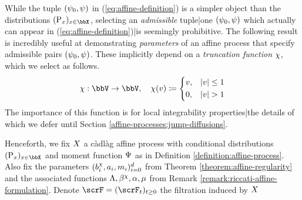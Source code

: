 While the tuple $(\psi_0, \psi)$ in (\ref{eq:affine-definition}) is a simpler object than the distributions $(\Prb_\stateVar)_{\stateVar\in\stateSpace}$, selecting an \emph{admissible} tuple|one $(\psi_0, \psi)$ which actually can appear in (\ref{eq:affine-definition})|is seemingly prohibitive.
The following result is incredibly useful at demonstrating \emph{parameters} of an affine process that specify admissible pairs $(\psi_0, \psi)$.
These implicitly depend on a \emph{truncation function} $\chi$, which we select as follows.
\begin{equation}
  \trunc: \vecSpace \rightarrow \vecSpace, \quad \trunc(\vecVar) \defeq \left\{\begin{aligned}
    &\vecVar, & |\vecVar| \leq 1 \\
    &0, & |\vecVar| > 1 
  \end{aligned}\right.
\end{equation}
The importance of this function is for local integrability properties|the details of which we defer until Section \ref{affine-processes:jump-diffusions}.






Henceforth, we fix $X$ a c\`adl\`ag affine process with conditional distributions $(\Prb_\stateVar)_{\stateVar\in\stateSpace}$ and moment function $\Psi$ as in Definition \ref{definition:affine-process}.
Also fix the parameters $(b^\chi_i, a_i, m_i)_{i=0}^d$ from Theorem \ref{theorem:affine-regularity} and the associated functions $\Lambda, \beta^\chi, \alpha, \mu$ from Remark \ref{remark:riccati-affine-formulation}.
Denote $\scrF=(\scrF_t)_{t\geq0}$ the filtration induced by $X$
